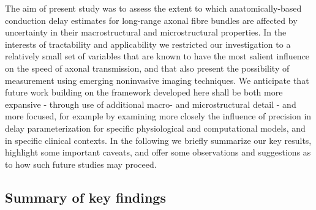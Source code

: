 






The aim of present study was to assess the extent to which anatomically-based conduction delay estimates for long-range axonal fibre bundles are affected by uncertainty in their macrostructural and microstructural properties. In the interests of tractability and applicability we restricted our investigation to a relatively small set of variables that are known to have the most salient influence on the speed of axonal transmission, and that also present the possibility of measurement using emerging noninvasive imaging techniques. We anticipate that future work building on the framework developed here shall be both more expansive - through use of additional macro- and microstructural detail - and more focused, for example by examining more closely the influence of precision in delay parameterization for specific physiological and computational models, and in specific clinical contexts. In the following we briefly summarize our key results, highlight some important caveats, and offer some observations and suggestions as to how such future studies may proceed.


\subsection{Summary of key findings}

